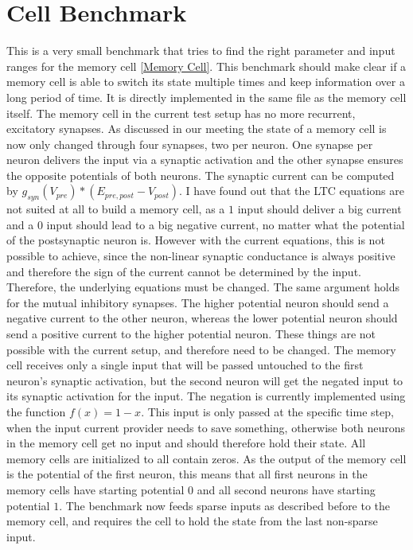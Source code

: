 \documentclass[draft,final]{vutinfth} %
\begin{document}
    \section{Cell Benchmark}
    This is a very small benchmark that tries to find the right parameter and input ranges for the memory cell \ref{Memory Cell}.
    This benchmark should make clear if a memory cell is able to switch its state multiple times and keep information over a long period of time.
    It is directly implemented in the same file as the memory cell itself.
    The memory cell in the current test setup has no more recurrent, excitatory synapses.
    As discussed in our meeting the state of a memory cell is now only changed through four synapses, two per neuron.
    One synapse per neuron delivers the input via a synaptic activation and the other synapse ensures the opposite potentials of both neurons.
    The synaptic current can be computed by $g_{syn}(V_{pre}) * (E_{pre,post} - V_{post})$.
    I have found out that the LTC equations are not suited at all to build a memory cell, as a $1$ input should deliver a big current and a $0$ input should lead to a big negative current, no matter what the potential of the postsynaptic neuron is.
    However with the current equations, this is not possible to achieve, since the non-linear synaptic conductance is always positive and therefore the sign of the current cannot be determined by the input.
    Therefore, the underlying equations must be changed.
    The same argument holds for the mutual inhibitory synapses. The higher potential neuron should send a negative current to the other neuron, whereas the lower potential neuron should send a positive current to the higher potential neuron.
    These things are not possible with the current setup, and therefore need to be changed.
    The memory cell receives only a single input that will be passed untouched to the first neuron's synaptic activation, but the second neuron will get the negated input to its synaptic activation for the input.
    The negation is currently implemented using the function $f(x) = 1-x$.
    This input is only passed at the specific time step, when the input current provider needs to save something, otherwise both neurons in the memory cell get no input and should therefore hold their state.
    All memory cells are initialized to all contain zeros.
    As the output of the memory cell is the potential of the first neuron, this means that all first neurons in the memory cells have starting potential $0$ and all second neurons have starting potential $1$.
    The benchmark now feeds sparse inputs as described before to the memory cell, and requires the cell to hold the state from the last non-sparse input.
\end{document}
